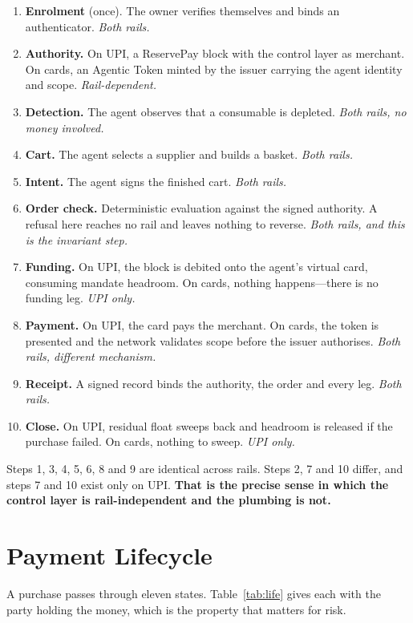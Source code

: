 \documentclass[journal,onecolumn,11pt]{IEEEtran}
\begin{document}
\begin{enumerate}[leftmargin=*,itemsep=2pt]
\item \textbf{Enrolment} (once). The owner verifies themselves and binds an
authenticator. \emph{Both rails.}
\item \textbf{Authority.} On UPI, a ReservePay block with the control layer as merchant.
On cards, an Agentic Token minted by the issuer carrying the agent identity and scope.
\emph{Rail-dependent.}
\item \textbf{Detection.} The agent observes that a consumable is depleted.
\emph{Both rails, no money involved.}
\item \textbf{Cart.} The agent selects a supplier and builds a basket. \emph{Both rails.}
\item \textbf{Intent.} The agent signs the finished cart. \emph{Both rails.}
\item \textbf{Order check.} Deterministic evaluation against the signed authority. A
refusal here reaches no rail and leaves nothing to reverse. \emph{Both rails, and this
is the invariant step.}
\item \textbf{Funding.} On UPI, the block is debited onto the agent's virtual card,
consuming mandate headroom. On cards, nothing happens---there is no funding leg.
\emph{UPI only.}
\item \textbf{Payment.} On UPI, the card pays the merchant. On cards, the token is
presented and the network validates scope before the issuer authorises. \emph{Both
rails, different mechanism.}
\item \textbf{Receipt.} A signed record binds the authority, the order and every leg.
\emph{Both rails.}
\item \textbf{Close.} On UPI, residual float sweeps back and headroom is released if the
purchase failed. On cards, nothing to sweep. \emph{UPI only.}
\end{enumerate}

Steps 1, 3, 4, 5, 6, 8 and 9 are identical across rails. Steps 2, 7 and 10 differ, and
steps 7 and 10 exist only on UPI. \textbf{That is the precise sense in which the control
layer is rail-independent and the plumbing is not.}

\section{Payment Lifecycle}\label{sec:life}
A purchase passes through eleven states. Table~\ref{tab:life} gives each with the party
holding the money, which is the property that matters for risk.
\end{document}
